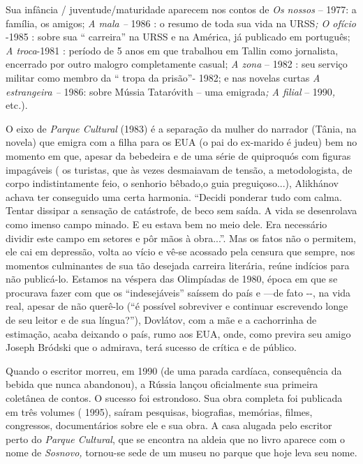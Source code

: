 Sua infância / juventude/maturidade aparecem nos contos de \emph{Os
nossos} -- 1977: a família, os amigos; \emph{A mala --} 1986 : o resumo
de toda sua vida na URSS\emph{; O ofício} -1985 : sobre sua ``
carreira'' na URSS e na América, já publicado em português; \emph{A
troca}-1981 : período de 5 anos em que trabalhou em Tallin como
jornalista, encerrado por outro malogro completamente casual; \emph{A
zona} -- 1982 : seu serviço militar como membro da `` tropa da prisão''-
1982; e nas novelas curtas \emph{A estrangeira --} 1986: sobre Mússia
Tataróvith -- uma emigrada\emph{; A filial} -- 1990\emph{,}
etc\emph{.}).

O eixo de \emph{Parque Cultural} (1983) é a separação da mulher do
narrador (Tânia, na novela) que emigra com a filha para os EUA (o pai do
ex-marido é judeu) bem no momento em que, apesar da bebedeira e de uma
série de quiproquós com figuras impagáveis ( os turistas, que às vezes
desmaiavam de tensão, a metodologista, de corpo indistintamente feio, o
senhorio bêbado,o guia preguiçoso...), Alikhánov achava ter conseguido
uma certa harmonia. ``Decidi ponderar tudo com calma. Tentar dissipar a
sensação de catástrofe, de beco sem saída. A vida se desenrolava como
imenso campo minado. E eu estava bem no meio dele. Era necessário
dividir este campo em setores e pôr mãos à obra...''. Mas os fatos não o
permitem, ele cai em depressão, volta ao vício e vê-se acossado pela
censura que sempre, nos momentos culminantes de sua tão desejada
carreira literária, reúne indícios para não publicá-lo. Estamos na
véspera das Olimpíadas de 1980, época em que se procurava fazer com que
os ``indesejáveis'' saíssem do país e ---de fato -\/-, na vida real,
apesar de não querê-lo (``é possível sobreviver e continuar escrevendo
longe de seu leitor e de sua língua?''), Dovlátov, com a mãe e a
cachorrinha de estimação, acaba deixando o país, rumo aos EUA, onde,
como previra seu amigo Joseph Bródski que o admirava, terá sucesso de
crítica e de público.

Quando o escritor morreu, em 1990 (de uma parada cardíaca, consequência
da bebida que nunca abandonou), a Rússia lançou oficialmente sua
primeira coletânea de contos. O sucesso foi estrondoso. Sua obra
completa foi publicada em três volumes ( 1995), saíram pesquisas,
biografias, memórias, filmes, congressos, documentários sobre ele e sua
obra. A casa alugada pelo escritor perto do \emph{Parque Cultural}, que
se encontra na aldeia que no livro aparece com o nome de \emph{Sosnovo,}
tornou-se sede de um museu no parque que hoje leva seu nome.

